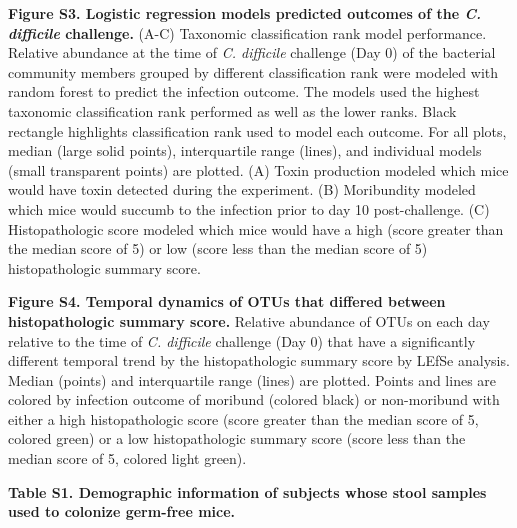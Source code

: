 \documentclass[
  12pt,
]{article}
\begin{document}
\textbf{Figure S3. Logistic regression models predicted outcomes of the
\emph{C. difficile} challenge.} (A-C) Taxonomic classification rank
model performance. Relative abundance at the time of \emph{C. difficile}
challenge (Day 0) of the bacterial community members grouped by
different classification rank were modeled with random forest to predict
the infection outcome. The models used the highest taxonomic
classification rank performed as well as the lower ranks. Black
rectangle highlights classification rank used to model each outcome. For
all plots, median (large solid points), interquartile range (lines), and
individual models (small transparent points) are plotted. (A) Toxin
production modeled which mice would have toxin detected during the
experiment. (B) Moribundity modeled which mice would succumb to the
infection prior to day 10 post-challenge. (C) Histopathologic score
modeled which mice would have a high (score greater than the median
score of 5) or low (score less than the median score of 5)
histopathologic summary score.

\hfill\break

\textbf{Figure S4. Temporal dynamics of OTUs that differed between
histopathologic summary score.} Relative abundance of OTUs on each day
relative to the time of \emph{C. difficile} challenge (Day 0) that have
a significantly different temporal trend by the histopathologic summary
score by LEfSe analysis. Median (points) and interquartile range (lines)
are plotted. Points and lines are colored by infection outcome of
moribund (colored black) or non-moribund with either a high
histopathologic score (score greater than the median score of 5, colored
green) or a low histopathologic summary score (score less than the
median score of 5, colored light green).

\hfill\break

\textbf{Table S1. Demographic information of subjects whose stool
samples used to colonize germ-free mice.}
\end{document}
